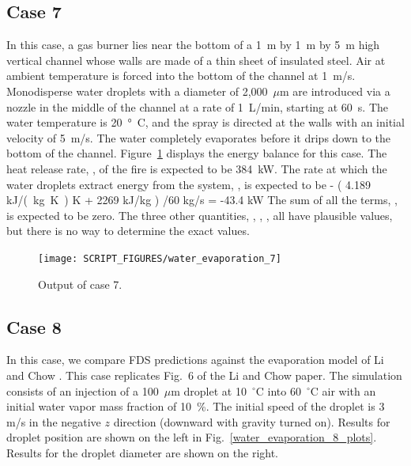 \documentclass[11pt]{book}
\begin{document}
\subsection{Case 7}
\label{water_evaporation_7}

In this case, a gas burner lies near the bottom of a 1~m by 1~m by 5~m high vertical channel whose walls are made of a thin sheet of insulated steel. Air at ambient temperature is forced into the bottom of the channel at 1~m/s. Monodisperse water droplets with a diameter of 2,000~$\mu$m are
introduced via a nozzle in the middle of the channel at a rate of 1~L/min, starting at 60~s. The water temperature is 20~\si{\degree C}, and the spray is directed at the walls with an initial velocity of 5~m/s.
The water completely evaporates before it drips down to the bottom of the channel.
Figure~\ref{water_evaporation_7_plot} displays the energy balance for this case. The heat release rate, , of the fire is expected to be 384~kW. The rate at which the water droplets extract energy from the system, , is expected to be
\be - \left( 4.189 \; \hbox{\si{kJ/(kg.K)}}  \; \hbox{K} + 2269 \; \hbox{kJ/kg} \right) /60 \; \hbox{kg/s} = -43.4 \; \hbox{kW} \ee
The sum of all the terms, , is expected to be zero. The three other quantities, , , , all have plausible values, but there is no way to determine the exact values.

\begin{figure}[h!]
\centering
\texttt{[image: SCRIPT\_FIGURES/water\_evaporation\_7]}
\caption[Sample case ]{Output of  case 7.}
\label{water_evaporation_7_plot}
\end{figure}

\clearpage

\subsection{Case 8}
\label{water_evaporation_8}

In this case, we compare FDS predictions against the evaporation model of Li and Chow \cite{LiChow:2008}. This case replicates Fig.~6 of the Li and Chow paper.  The simulation consists of an injection of a 100~$\mu$m droplet at 10~$^\circ$C into 60~$^\circ$C air with an initial water vapor mass fraction of 10~\%. The initial speed of the droplet is 3 m/s in the negative $z$ direction (downward with gravity turned on).  Results for droplet position are shown on the left in Fig.~\ref{water_evaporation_8_plots}.  Results for the droplet diameter are shown on the right.
\end{document}
